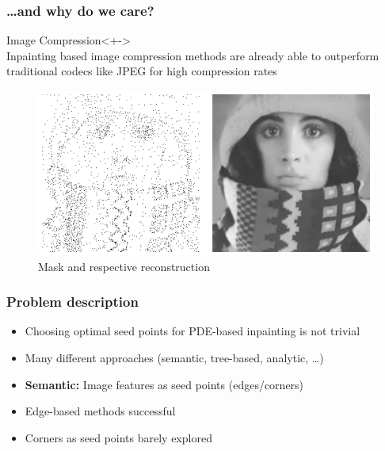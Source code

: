 \documentclass{beamer}
\begin{document}
    \begin{frame}[t]
        \frametitle{\dots and why do we care?}
        \begin{block}{Image Compression}<+->\ \\
            Inpainting based image compression methods are already able to outperform traditional
            codecs like JPEG for high compression rates 
        \end{block}
         {
            \begin{figure}
                \centering
                \includegraphics[width=0.85\textheight]{../thesis/Images/pde_example.png}
            \caption{Mask and respective reconstruction~\cite{hoeltgen12}}
            \end{figure}
        }
    \end{frame}


    \begin{frame}[t]
        \frametitle{Problem description}
        \begin{itemize}[<+-|alert@+>]
            \item Choosing optimal seed points for PDE-based inpainting is not trivial
            \item Many different approaches (semantic, tree-based, analytic, \dots)
            \item \textbf{Semantic:} Image features as seed points (edges/corners)
            \item Edge-based methods successful~\cite{mainberger10}
            \item Corners as seed points barely explored
        \end{itemize}
    \end{frame}
\end{document}
